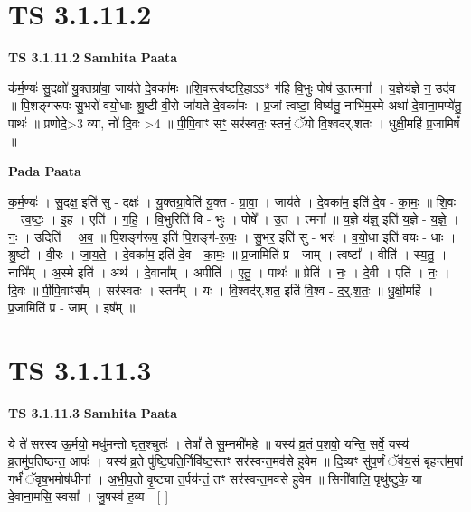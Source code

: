 \documentclass[17pt]{extarticle}
\begin{document}
\section*{ TS 3.1.11.2 }

\textbf{TS 3.1.11.2 } \newline
\textbf{Samhita Paata} \newline

क॑र्म॒ण्यः॑ सु॒दक्षो॑ यु॒क्तग्रा॑वा॒ जाय॑ते दे॒वका॑मः ॥शि॒वस्त्व॑ष्टरि॒हाऽऽ* ग॑हि वि॒भुः पोष॑ उ॒तत्मना᳚ । य॒ज्ञेय॑ज्ञे न॒ उद॑व ॥ पि॒शङ्ग॑रूपः सु॒भरो॑ वयो॒धाः श्रु॒ष्टी वी॒रो जा॑यते दे॒वका॑मः । प्र॒जां त्वष्टा॒ विष्य॑तु॒ नाभि॑म॒स्मे अथा॑ दे॒वाना॒मप्ये॑तु॒ पाथः॑ ॥ प्रणो॑दे॒>3 व्या, नो॑ दि॒वः >4 ॥ पी॒पि॒वाꣳ सꣳ॒॒ सर॑स्वतः॒ स्तनं॒ ॅयो वि॒श्वद॑र्.शतः । धुक्षी॒महि॑ प्र॒जामिषं᳚ ॥ \newline

\textbf{Pada Paata} \newline

क॒र्म॒ण्यः॑ । सु॒दक्ष॒ इति॑ सु - दक्षः॑ । यु॒क्तग्रा॒वेति॑ यु॒क्त - ग्रा॒वा॒ । जाय॑ते । दे॒वका॑म॒ इति॑ दे॒व - का॒मः॒ ॥ शि॒वः । त्व॒ष्टः॒ । इ॒ह । एति॑ । ग॒हि॒ । वि॒भुरिति॑ वि - भुः । पोषे᳚ । उ॒त । त्मना᳚ ॥ य॒ज्ञे य॑ज्ञ्॒ इति॑ य॒ज्ञे - य॒ज्ञे॒ । नः॒ । उदिति॑ । अ॒व॒ ॥ पि॒शङ्ग॑रूप॒ इति॑ पि॒शङ्ग॑-रू॒पः॒ । सु॒भर॒ इति॑ सु - भरः॑ । व॒यो॒धा इति॑ वयः - धाः । श्रु॒ष्टी । वी॒रः । जा॒य॒ते॒ । दे॒वका॑म॒ इति॑ दे॒व - का॒मः॒ ॥ प्र॒जामिति॑ प्र - जाम् । त्वष्टा᳚ । वीति॑ । स्य॒तु॒ । नाभि᳚म् । अ॒स्मे इति॑ । अथ॑ । दे॒वाना᳚म् । अपीति॑ । ए॒तु॒ । पाथः॑ ॥ प्रेति॑ । नः॒ । दे॒वी । एति॑ । नः॒ । दि॒वः ॥ पी॒पि॒वाꣳस᳚म् । सर॑स्वतः । स्तन᳚म् । यः । वि॒श्वद॑र्.शत॒ इति॑ वि॒श्व - द॒र्॒.श॒तः॒ ॥ धु॒क्षी॒महि॑ । प्र॒जामिति॑ प्र - जाम् । इष᳚म् ॥  \newline




\section*{ TS 3.1.11.3 }

\textbf{TS 3.1.11.3 } \newline
\textbf{Samhita Paata} \newline

ये ते॑ सरस्व ऊ॒र्मयो॒ मधु॑मन्तो घृत॒श्चुतः॑ । तेषां᳚ ते सु॒म्नमी॑महे ॥ यस्य॑ व्र॒तं प॒शवो॒ यन्ति॒ सर्वे॒ यस्य॑ व्र॒तमु॑प॒तिष्ठ॑न्त॒ आपः॑ । यस्य॑ व्र॒ते पु॑ष्टि॒पति॒र्निवि॑ष्ट॒स्तꣳ सर॑स्वन्त॒मव॑से हुवेम ॥ दि॒व्यꣳ सु॑प॒र्णं ॅव॑य॒सं बृ॒हन्त॑म॒पां गर्भं॑ ॅवृष॒भमोष॑धीनां । अ॒भी॒प॒तो वृ॒ष्ट्या त॒र्पय॑न्तं॒ तꣳ सर॑स्वन्त॒मव॑से हुवेम ॥ सिनी॑वालि॒ पृथु॑ष्टुके॒ या दे॒वाना॒मसि॒ स्वसा᳚ । जु॒षस्व॑ ह॒व्य - [  ] \newline
\end{document}
